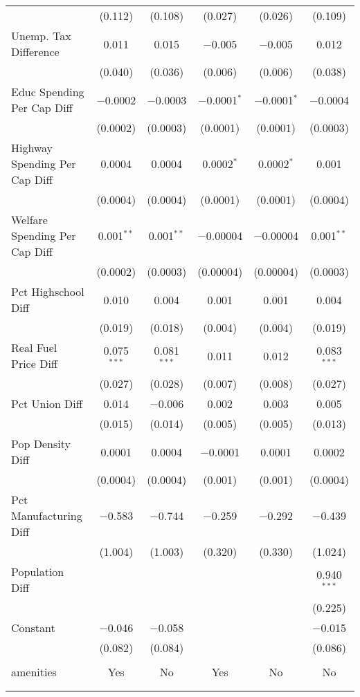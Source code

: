 \begin{table}[!htbp]
\begin{tabular}{@{\extracolsep{5pt}}lccccc}
  & (0.112) & (0.108) & (0.027) & (0.026) & (0.109) \\ 
  Unemp. Tax Difference & 0.011 & 0.015 & $-$0.005 & $-$0.005 & 0.012 \\ 
  & (0.040) & (0.036) & (0.006) & (0.006) & (0.038) \\ 
  Educ Spending Per Cap Diff & $-$0.0002 & $-$0.0003 & $-$0.0001$^{*}$ & $-$0.0001$^{*}$ & $-$0.0004 \\ 
  & (0.0002) & (0.0003) & (0.0001) & (0.0001) & (0.0003) \\ 
  Highway Spending Per Cap Diff & 0.0004 & 0.0004 & 0.0002$^{*}$ & 0.0002$^{*}$ & 0.001 \\ 
  & (0.0004) & (0.0004) & (0.0001) & (0.0001) & (0.0004) \\ 
  Welfare Spending Per Cap Diff & 0.001$^{**}$ & 0.001$^{**}$ & $-$0.00004 & $-$0.00004 & 0.001$^{**}$ \\ 
  & (0.0002) & (0.0003) & (0.00004) & (0.00004) & (0.0003) \\ 
  Pct Highschool Diff & 0.010 & 0.004 & 0.001 & 0.001 & 0.004 \\ 
  & (0.019) & (0.018) & (0.004) & (0.004) & (0.019) \\ 
  Real Fuel Price Diff & 0.075$^{***}$ & 0.081$^{***}$ & 0.011 & 0.012 & 0.083$^{***}$ \\ 
  & (0.027) & (0.028) & (0.007) & (0.008) & (0.027) \\ 
  Pct Union Diff & 0.014 & $-$0.006 & 0.002 & 0.003 & 0.005 \\ 
  & (0.015) & (0.014) & (0.005) & (0.005) & (0.013) \\ 
  Pop Density Diff & 0.0001 & 0.0004 & $-$0.0001 & 0.0001 & 0.0002 \\ 
  & (0.0004) & (0.0004) & (0.001) & (0.001) & (0.0004) \\ 
  Pct Manufacturing Diff & $-$0.583 & $-$0.744 & $-$0.259 & $-$0.292 & $-$0.439 \\ 
  & (1.004) & (1.003) & (0.320) & (0.330) & (1.024) \\ 
  Population Diff &  &  &  &  & 0.940$^{***}$ \\ 
  &  &  &  &  & (0.225) \\ 
  Constant & $-$0.046 & $-$0.058 &  &  & $-$0.015 \\ 
  & (0.082) & (0.084) &  &  & (0.086) \\ 
 \hline \\[-1.8ex] 
amenities & Yes & No & Yes & No & No \\ 
\hline \\[-1.8ex] 
\hline 
\hline \\[-1.8ex] 
\end{tabular} 
\end{table} 
